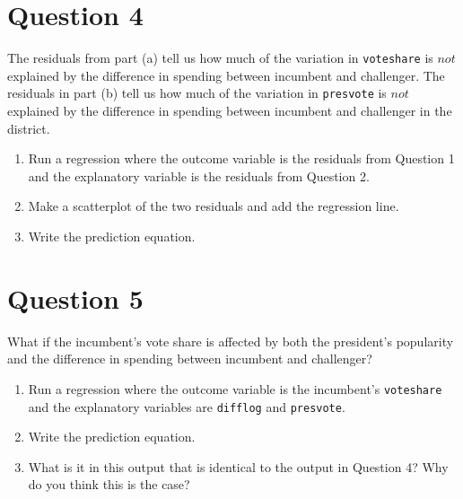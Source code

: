 \documentclass[12pt,letterpaper]{article}
\begin{document}
\section*{Question 4}%
\noindent The residuals from part (a) tell us how much of the variation in \texttt{voteshare} is $not$ explained by the difference in spending between incumbent and challenger. The residuals in part (b) tell us how much of the variation in \texttt{presvote} is $not$ explained by the difference in spending between incumbent and challenger in the district.
\begin{enumerate}
\item Run a regression where the outcome variable is the residuals from Question 1 and the explanatory variable is the residuals from Question 2.	\vspace{6cm}
\item Make a scatterplot of the two residuals and add the regression line. 	\vspace{6cm}
\item Write the prediction equation.
\end{enumerate}

\newpage	

\section*{Question 5}%
\noindent What if the incumbent's vote share is affected by both the president's popularity and the difference in spending between incumbent and challenger? 
\begin{enumerate}
\item Run a regression where the outcome variable is the incumbent's \texttt{voteshare} and the explanatory variables are \texttt{difflog} and \texttt{presvote}.	\vspace{5cm}
\item Write the prediction equation.	\vspace{5cm}
\item What is it in this output that is identical to the output in Question 4? Why do you think this is the case?%
\end{enumerate}
\end{document}
